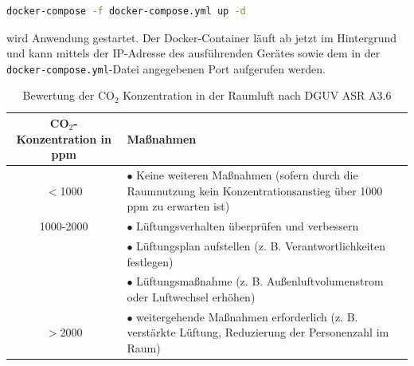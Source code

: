\documentclass[a4paper,
    11pt,
    headings=small,
    ngerman,
    listof=totoc,
    numbers=noenddot]{scrreprt}[2021/11/13]
\begin{document}
\begin{lstlisting}[language=Bash]
  docker-compose -f docker-compose.yml up -d
\end{lstlisting}

wird Anwendung gestartet. Der \gls{Docker}-Container läuft ab jetzt im Hintergrund und kann mittels der IP-Adresse des ausführenden Gerätes sowie dem in der \texttt{docker-compose.yml}-Datei angegebenen Port aufgerufen werden.

\newpage

\listoffigures
\lstlistoflistings
\printglossary
\printbibliography

\newpage

\appendix
{}

\tableofcontents
\listoffigures
\listoftables
\lstlistoflistings


\begin{table}[htbp]
  \centering
  \renewcommand{\arraystretch}{1.25}
  \caption{Bewertung der CO$_2$ Konzentration in der Raumluft nach \ac{DGUV} \ac{ASR} A3.6 \autocite{ASR}}
  \begin{tabular}{c|p{}}
    CO$_2$-Konzentration in \ac{ppm} & Maßnahmen                                                                                                                  \\
    \hline
    $<$1000                          & $\bullet$ Keine weiteren Maßnahmen (sofern durch die Raumnutzung kein Konzentrationsanstieg über 1000 ppm zu erwarten ist) \\
    \hline
    1000-2000                        & $\bullet$ Lüftungsverhalten überprüfen und verbessern                                                                      \\
                                     & $\bullet$ Lüftungsplan aufstellen (z. B. Verantwortlichkeiten festlegen)                                                   \\
                                     & $\bullet$ Lüftungsmaßnahme (z. B. Außenluftvolumenstrom oder Luftwechsel erhöhen)                                          \\
    \hline
    $>$2000                          & $\bullet$ weitergehende Maßnahmen erforderlich (z. B. verstärkte Lüftung, Reduzierung der Personenzahl im Raum)            \\
  \end{tabular}
  \label{appendix:tab:dguv_table_co2}
\end{table}
\end{document}
